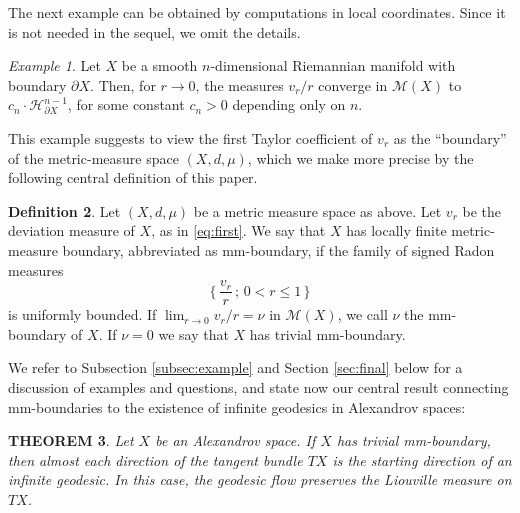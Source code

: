 \documentclass[12pt,leqno]{amsart}
\numberwithin{equation}{section}
\newtheorem{thm}{THEOREM}[section]
\theoremstyle{definition}
\newtheorem{defn}[thm]{Definition}%
\theoremstyle{remark}
\newtheorem{ex}[thm]{Example}
\begin{document}
The next example can be obtained by computations in local coordinates. Since it is not needed in the sequel, we omit
  the details.




  \begin{ex} \label{mainex}
Let $X$ be a smooth $n$-dimensional Riemannian manifold with boundary $\partial X$.
Then, for $r\to 0$, the measures   $v_r/r$  converge in $\mathcal M(X)$ to
$c_n \cdot \mathcal H^{n-1} _{\partial X}$, for some constant $c_n >0$ depending only on $n$.
\end{ex}

This example  suggests  to view the first Taylor coefficient of $v_r$   as the ``boundary'' of the metric-measure space $(X, d, \mu)$,
 which we make more precise by the following central definition of this paper.

\begin{defn} \label{def:first}
Let $(X,d,\mu)$ be a metric measure space as above.  Let   $v_r$ be the deviation measure of $X$,  as in \eqref{eq:first}.
We say that $X$ has   locally finite metric-measure boundary, abbreviated as  mm-boundary,
if the  family of signed Radon measures
\[\{\, \frac { v_r }  {r } \,;\,  0<r\leq  1 \,\}\]
is uniformly bounded.
If  $\lim _{r\to 0} v_r  /r =\nu $ in $\mathcal M(X)$, we call $\nu$ the mm-boundary of $X$.  If $\nu =0$ we say that $X$ has trivial mm-boundary.
\end{defn}


We refer to Subsection \ref{subsec:example}  and Section \ref{sec:final}  below for a discussion of  examples and questions, and
 state now our central  result connecting  mm-boundaries to the existence  of infinite geodesics in Alexandrov spaces:

 \begin{thm} \label{thmmain}
 Let $X$ be an Alexandrov space. If $X$ has trivial mm-boundary, then  almost each direction of the tangent
 bundle $TX$ is the starting direction of  an infinite geodesic. In this case, the geodesic flow preserves the Liouville measure on $TX$.
 \end{thm}
\end{document}
